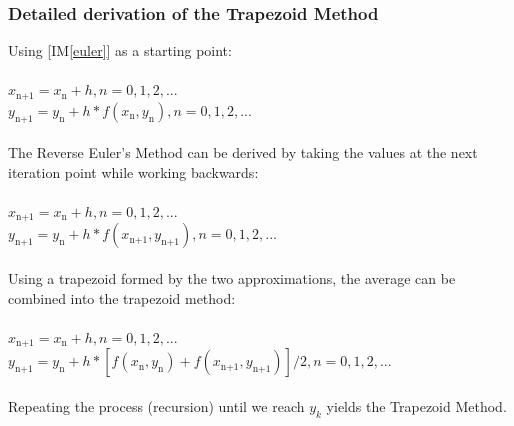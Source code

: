 \documentclass[12pt]{article}
\newcommand{\iref}[1]{IM\ref{#1}}
\begin{document}
\subsubsection*{Detailed derivation of the Trapezoid Method}

Using [\iref{euler}] as a starting point:\\
\\
\hspace*{2ex}$x_\text{n+1} = x_\text{n} + h, n = 0, 1, 2,...$\\
\hspace*{2ex}$y_\text{n+1} = y_\text{n} + h*f(x_\text{n}, y_\text{n}), n = 0, 1, 2,...$\\
\\
The Reverse Euler's Method can be derived by taking the values at the next iteration point
while working backwards:\\
\\
\hspace*{2ex}$x_\text{n+1} = x_\text{n} + h, n = 0, 1, 2,...$\\
\hspace*{2ex}$y_\text{n+1} = y_\text{n} + h*f(x_\text{n+1}, y_\text{n+1}), n = 0, 1, 2,...$\\
\\
Using a trapezoid formed by the two approximations, the average can be combined into the
trapezoid method:\\
\\
\hspace*{2ex}$x_\text{n+1} = x_\text{n} + h, n = 0, 1, 2,...$\\
\hspace*{2ex}$y_\text{n+1} = y_\text{n} + h*[f(x_\text{n}, y_\text{n})+f(x_\text{n+1},
y_\text{n+1})] / 2, n = 0, 1, 2,...$\\
\\
Repeating the process (recursion) until we reach $y_k$ yields the Trapezoid Method.\\

~\newline

\end{document}
